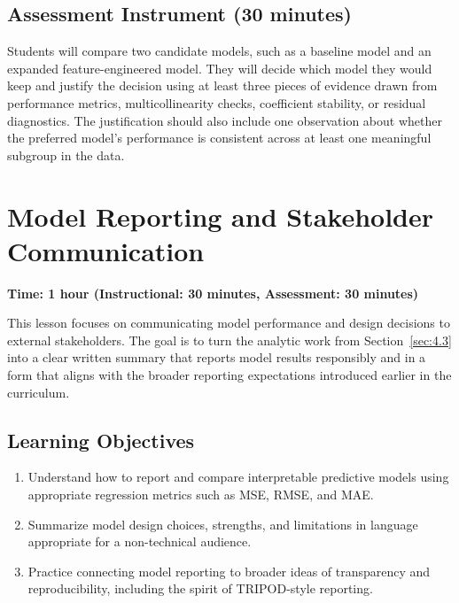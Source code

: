 \subsection{Assessment Instrument (30 minutes)}

Students will compare two candidate models, such as a baseline
model and an expanded feature-engineered model. They will decide
which model they would keep and justify the decision using at least
three pieces of evidence drawn from performance metrics,
multicollinearity checks, coefficient stability, or residual
diagnostics. The justification should also include one observation
about whether the preferred model's performance is consistent across
at least one meaningful subgroup in the data.

\section{Model Reporting and Stakeholder Communication}
\label{sec:4.4}

\textbf{Time: 1 hour (Instructional: 30 minutes, Assessment:
30 minutes)}

\noindent This lesson focuses on communicating model performance
and design decisions to external stakeholders. The goal is to turn
the analytic work from Section~\ref{sec:4.3} into a clear written
summary that reports model results responsibly and in a form that
aligns with the broader reporting expectations introduced earlier
in the curriculum.

\subsection{Learning Objectives}

\begin{enumerate}
    \item Understand how to report and compare interpretable
    predictive models using appropriate regression metrics such as
    MSE, RMSE, and MAE.
    \item Summarize model design choices, strengths, and limitations
    in language appropriate for a non-technical audience.
    \item Practice connecting model reporting to broader ideas of
    transparency and reproducibility, including the spirit of
    TRIPOD-style reporting.
\end{enumerate}

